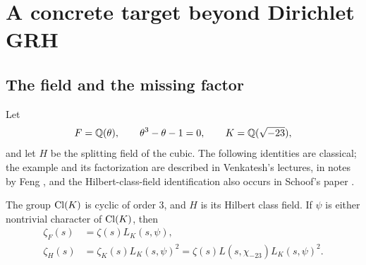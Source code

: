 \section{A concrete target beyond Dirichlet GRH}\label{sec:cubic}

\subsection{The field and the missing factor}

Let
\[
F=\mathbb{Q}(\theta),\qquad \theta^3-\theta-1=0,
\qquad K=\mathbb{Q}(\sqrt{-23}),
\]
and let \(H\) be the splitting field of the cubic. The following identities are classical; the example and its factorization are described in Venkatesh's lectures, in notes by Feng \cite{venkatesh}, and the Hilbert-class-field identification also occurs in Schoof's paper \cite{schoof}.

\begin{proposition}\label{prop:cubic}
The group \(\operatorname{Cl}(K)\) is cyclic of order \(3\), and \(H\) is its Hilbert class field. If \(\psi\) is either nontrivial character of \(\operatorname{Cl}(K)\), then
\begin{align}
\zeta_F(s)&=\zeta(s)L_K(s,\psi),\label{eq:cubic}\\
\zeta_H(s)&=\zeta_K(s)L_K(s,\psi)^2
=\zeta(s)L(s,\chi_{-23})L_K(s,\psi)^2.\label{eq:galois}
\end{align}
\end{proposition}

